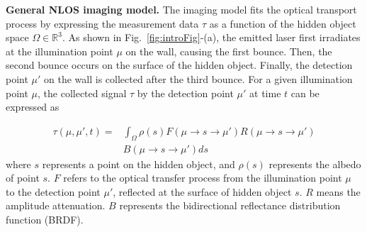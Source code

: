 \vspace{0.8mm}
\noindent \textbf{General NLOS imaging model.}
The imaging model fits the optical transport process by expressing the measurement data $\tau$ as a function of the hidden object space $\Omega \in \mathbb{R}^3$. As shown in Fig.~\ref{fig:introFig}-(a), the emitted laser first irradiates at the illumination point $\mu$ on the wall, causing the first bounce. Then, the second bounce occurs on the surface of the hidden object. Finally, the detection point $\mu'$ on the wall is collected after the third bounce. For a given illumination point $\mu$, the collected  signal $\tau$ by the detection point $\mu'$ at time $t$ can be expressed as~\cite{otooleConfocalNonlineofsightImaging2018}

\begin{equation}
    \begin{split}
    \tau(\mu,\mu',t) =  &\int_{\Omega} \rho(s) F(\mu \rightarrow s \rightarrow \mu')  R(\mu\rightarrow s \rightarrow \mu') \\
    & B(\mu\rightarrow s \rightarrow \mu') ds
    \end{split}
    \label{eq1}
\end{equation}
where $s$ represents a point on the hidden object, and $\rho(s)$ represents the albedo of point $s$. $F$ refers to the optical transfer process from the illumination point $\mu$ to the detection point $\mu'$, reflected at the surface of hidden object $s$. $R$ means the amplitude attenuation. $B$ represents the bidirectional reflectance distribution function (BRDF).

